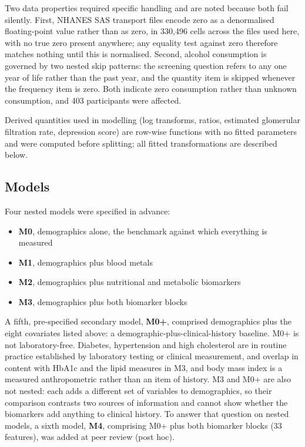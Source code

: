 \documentclass[12pt]{article}
\begin{document}
Two data properties required specific handling and are noted because both fail silently. First, NHANES SAS transport files encode zero as a denormalised floating-point value rather than as zero, in 330,496 cells across the files used here, with no true zero present anywhere; any equality test against zero therefore matches nothing until this is normalised. Second, alcohol consumption is governed by two nested skip patterns: the screening question refers to any one year of life rather than the past year, and the quantity item is skipped whenever the frequency item is zero. Both indicate zero consumption rather than unknown consumption, and 403 participants were affected.

Derived quantities used in modelling (log transforms, ratios, estimated glomerular filtration rate, depression score) are row-wise functions with no fitted parameters and were computed before splitting; all fitted transformations are described below.

\subsection*{Models}

Four nested models were specified in advance:

\begin{itemize}
\item \textbf{M0}, demographics alone, the benchmark against which everything is measured
\item \textbf{M1}, demographics plus blood metals
\item \textbf{M2}, demographics plus nutritional and metabolic biomarkers
\item \textbf{M3}, demographics plus both biomarker blocks
\end{itemize}

A fifth, pre-specified secondary model, \textbf{M0+}, comprised demographics plus the eight covariates listed above: a demographic-plus-clinical-history baseline. M0+ is not laboratory-free. Diabetes, hypertension and high cholesterol are in routine practice established by laboratory testing or clinical measurement, and overlap in content with HbA1c and the lipid measures in M3, and body mass index is a measured anthropometric rather than an item of history. M3 and M0+ are also not nested: each adds a different set of variables to demographics, so their comparison contrasts two sources of information and cannot show whether the biomarkers add anything to clinical history. To answer that question on nested models, a sixth model, \textbf{M4}, comprising M0+ plus both biomarker blocks (33 features), was added at peer review (post hoc).
\end{document}
